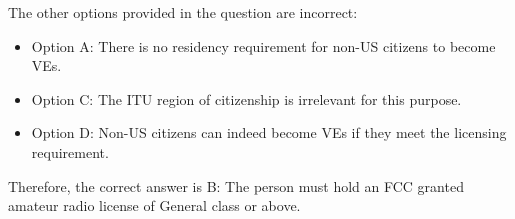 The other options provided in the question are incorrect:
\begin{itemize}
    \item Option A: There is no residency requirement for non-US citizens to become VEs.
    \item Option C: The ITU region of citizenship is irrelevant for this purpose.
    \item Option D: Non-US citizens can indeed become VEs if they meet the licensing requirement.
\end{itemize}

Therefore, the correct answer is B: The person must hold an FCC granted amateur radio license of General class or above.

